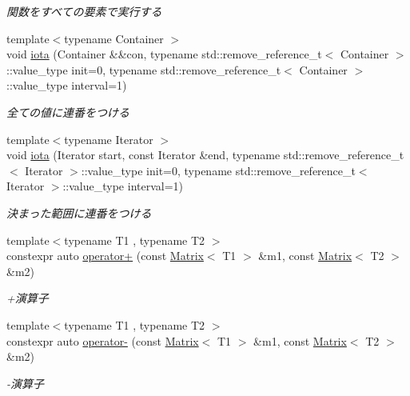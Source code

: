 \begin{DoxyCompactItemize}
\begin{DoxyCompactList}\small\item\em 関数をすべての要素で実行する \end{DoxyCompactList}\item 
{\footnotesize template$<$typename Container $>$ }\\void \mbox{\hyperlink{namespacesaki_ae2d32321776d936bd523e70b82f9236c}{iota}} (Container \&\&con, typename std\+::remove\+\_\+reference\+\_\+t$<$ Container $>$\+::value\+\_\+type init=0, typename std\+::remove\+\_\+reference\+\_\+t$<$ Container $>$\+::value\+\_\+type interval=1)
\begin{DoxyCompactList}\small\item\em 全ての値に連番をつける \end{DoxyCompactList}\item 
{\footnotesize template$<$typename Iterator $>$ }\\void \mbox{\hyperlink{namespacesaki_a45760a54288991b21995d0b2338ea134}{iota}} (Iterator start, const Iterator \&end, typename std\+::remove\+\_\+reference\+\_\+t$<$ Iterator $>$\+::value\+\_\+type init=0, typename std\+::remove\+\_\+reference\+\_\+t$<$ Iterator $>$\+::value\+\_\+type interval=1)
\begin{DoxyCompactList}\small\item\em 決まった範囲に連番をつける \end{DoxyCompactList}\item 
{\footnotesize template$<$typename T1 , typename T2 $>$ }\\constexpr auto \mbox{\hyperlink{namespacesaki_a2ce80b823ffc05593663b5ebaeac9ff2}{operator+}} (const \mbox{\hyperlink{classsaki_1_1_matrix}{Matrix}}$<$ T1 $>$ \&m1, const \mbox{\hyperlink{classsaki_1_1_matrix}{Matrix}}$<$ T2 $>$ \&m2)
\begin{DoxyCompactList}\small\item\em +演算子 \end{DoxyCompactList}\item 
{\footnotesize template$<$typename T1 , typename T2 $>$ }\\constexpr auto \mbox{\hyperlink{namespacesaki_a6980888c403aa3728ab24202fe155295}{operator-\/}} (const \mbox{\hyperlink{classsaki_1_1_matrix}{Matrix}}$<$ T1 $>$ \&m1, const \mbox{\hyperlink{classsaki_1_1_matrix}{Matrix}}$<$ T2 $>$ \&m2)
\begin{DoxyCompactList}\small\item\em -\/演算子 \end{DoxyCompactList}\item 

\end{DoxyCompactItemize}
